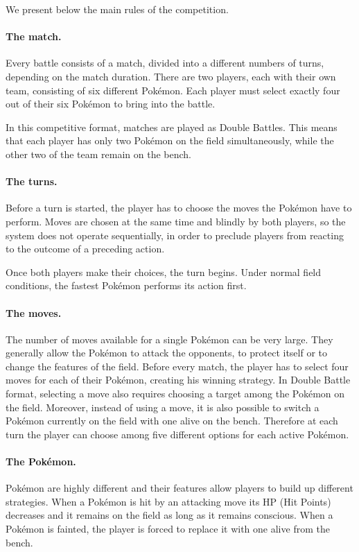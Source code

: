 \documentclass{article}
\begin{document}
We present below the main rules of the competition.

\paragraph*{The match.}
Every battle consists of a match, divided into a different numbers of turns, depending on the match duration. There are two players, each with their own team, consisting of six different Pokémon. Each player must select exactly four out of their six Pokémon to bring into the battle. 

In this competitive format, matches are played as Double Battles. This means that each player has only two Pokémon on the field simultaneously, while the other two of the team remain on the bench. 
\paragraph*{The turns.}
Before a turn is started, the player has to choose the moves the Pokémon have to perform. Moves are chosen at the same time and blindly by both players, so the system does not operate sequentially, in order to preclude players from reacting to the outcome of a preceding action.

Once both players make their choices,
the turn begins. Under normal field conditions, the fastest Pokémon performs its action first.
\paragraph*{The moves.} 
The number of moves available for a single Pokémon can be very large. They generally allow the Pokémon to attack the opponents, to protect itself or to change the features of the field. Before every match, the player has to select four moves for each of their Pokémon, creating his winning strategy.
In Double Battle format, selecting a move also requires choosing a target among the Pokémon on the field.
Moreover, instead of using a move, it is also possible to switch a Pokémon currently on the field with one alive on the bench. Therefore at each turn the player can choose among five different options for each active Pokémon.
\paragraph*{The Pokémon.}
Pokémon are highly different and their  features allow players to build up different strategies. When a Pokémon is hit by an attacking move its HP (Hit Points) decreases and it remains on the field as long as it remains conscious. When a Pokémon is fainted, the player is forced to replace it with one alive from the bench. 
\end{document}
